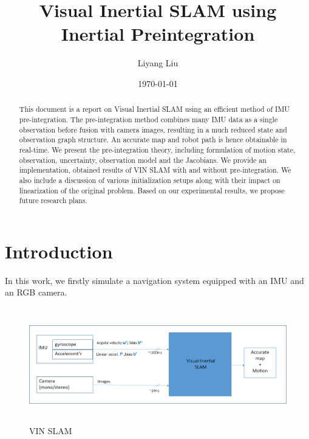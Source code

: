\documentclass[12pt]{article}   %
\begin{document}


\title{Visual Inertial SLAM using Inertial Preintegration}
\author{Liyang Liu}
\date{\today}

\maketitle

\begin{abstract}
This document is a report on Visual Inertial SLAM using an efficient method of IMU pre-integration. The pre-integration method combines many IMU data as a single observation before fusion with camera images, resulting in a much reduced state and observation graph structure. An accurate map and robot path is hence obtainable in real-time. We present the pre-integration theory, including formulation of motion state, observation, uncertainty, observation model and the Jacobians. We provide an implementation, obtained results of VIN SLAM with and without pre-integration. We also include a discussion of various initialization setups along with their impact on linearization of the original problem. Based on our experimental results, we propose future research plans.
\end{abstract}

\newpage

\tableofcontents

\newpage

\section{Introduction}

\vspace{1cm}
In this work, we firstly simulate a navigation system equipped with an IMU and an RGB camera. 
\begin{figure}[ht]
	\includegraphics[height=5cm]{figures/VIN_block-diagram.png}
	\caption{VIN SLAM}
	\label{fig:vin}
\end{figure}
\end{document}
